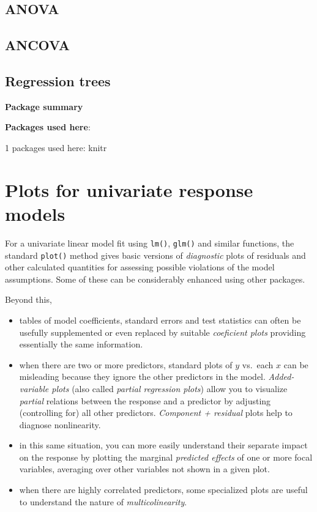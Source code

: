 \documentclass[
  letterpaper,
  10pt,
  krantz2]{krantz}
\begin{document}
\section{ANOVA}\label{anova}

\section{ANCOVA}\label{ancova}

\section{Regression trees}\label{regression-trees}

\textbf{Package summary}

\textbf{Packages used here}:

1 packages used here: knitr

\chapter{Plots for univariate response
models}\label{sec-linear-models-plots}

For a univariate linear model fit using \texttt{lm()}, \texttt{glm()}
and similar functions, the standard \texttt{plot()} method gives basic
versions of \emph{diagnostic} plots of residuals and other calculated
quantities for assessing possible violations of the model assumptions.
Some of these can be considerably enhanced using other packages.

Beyond this,

\begin{itemize}
\item
  tables of model coefficients, standard errors and test statistics can
  often be usefully supplemented or even replaced by suitable
  \emph{coeficient plots} providing essentially the same information.
\item
  when there are two or more predictors, standard plots of \(y\)
  vs.~each \(x\) can be misleading because they ignore the other
  predictors in the model. \emph{Added-variable plots} (also called
  \emph{partial regression plots}) allow you to visualize \emph{partial}
  relations between the response and a predictor by adjusting
  (controlling for) all other predictors. \emph{Component + residual}
  plots help to diagnose nonlinearity.
\item
  in this same situation, you can more easily understand their separate
  impact on the response by plotting the marginal \emph{predicted
  effects} of one or more focal variables, averaging over other
  variables not shown in a given plot.
\item
  when there are highly correlated predictors, some specialized plots
  are useful to understand the nature of \emph{multicolinearity}.
\end{itemize}
\end{document}
